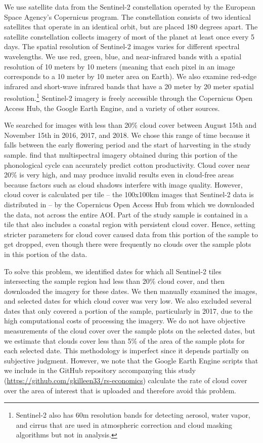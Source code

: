 \documentclass{article}
\begin{document}
We use satellite data from the Sentinel-2 constellation operated by the European Space Agency’s Copernicus program. The constellation consists of two identical satellites that operate in an identical orbit, but are placed 180 degrees apart. The satellite constellation collects imagery of most of the planet at least once every 5 days. The spatial resolution of Sentinel-2 images varies for different spectral wavelengths. We use red, green, blue, and near-infrared bands with a spatial resolution of 10 meters by 10 meters (meaning that each pixel in an image corresponds to a 10 meter by 10 meter area on Earth). We also examine red-edge infrared and short-wave infrared bands that have a 20 meter by 20 meter spatial resolution.\footnote{Sentinel-2 also has 60m resolution bands for detecting aerosol, water vapor, and cirrus that are used in atmospheric correction and cloud masking algorithms but not in analysis.} Sentinel-2 imagery is freely accessible through the Copernicus Open Access Hub, the Google Earth Engine, and a variety of other sources. 

We searched for images with less than 20\% cloud cover between August 15th and November 15th in 2016, 2017, and 2018. We chose this range of time because it falls between the early flowering period and the start of harvesting in the study sample. \citet{Zhao2007CanopyPrediction} find that multispectral imagery obtained during this portion of the phonological cycle can accurately predict cotton productivity. Cloud cover near 20\% is very high, and may produce invalid results even in cloud-free areas because factors such as cloud shadows interfere with image quality. However, cloud cover is calculated per tile -- the 100x100km images that Sentinel-2 data is distributed in -- by the Copernicus Open Access Hub from which we downloaded the data, not across the entire AOI. Part of the study sample is contained in a tile that also includes a coastal region with persistent cloud cover. Hence, setting stricter parameters for cloud cover caused data from this portion of the sample to get dropped, even though there were frequently no clouds over the sample plots in this portion of the data. 

To solve this problem, we identified dates for which all Sentinel-2 tiles intersecting the sample region had less than 20\% cloud cover, and then downloaded the imagery for these dates. We then manually examined the images, and selected dates for which cloud cover was very low. We also excluded several dates that only covered a portion of the sample, particularly in 2017, due to the high computational costs of processing the imagery. We do not have objective measurements of the cloud cover over the sample plots on the selected dates, but we estimate that clouds cover less than 5\% of the area of the sample plots for each selected date. This methodology is imperfect since it depends partially on subjective judgment. However, we note that the Google Earth Engine scripts that we include in the GitHub repository accompanying this study (\url{https://github.com/gkilleen33/rs-economics}) calculate the rate of cloud cover over the area of interest that is uploaded and therefore avoid this problem. 
\end{document}
